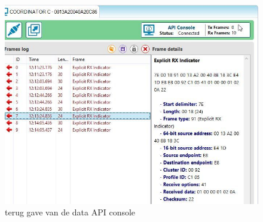 \documentclass[12pt]{article}
\begin{document}
\begin{figure}[H]
\captionsetup{justification=raggedright,
singlelinecheck=false
}
\includegraphics[scale=0.7] {1c-een}
\caption{terug gave van de data API console}
\end{figure}
\begin{lstlisting}
\end{lstlisting}
\end{document}
